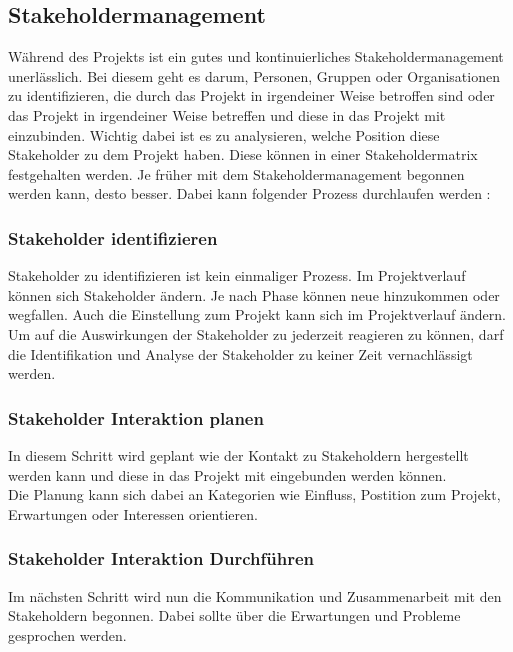 \documentclass[ThesisDJ.tex]{subfiles}
\begin{document}
\subsection{Stakeholdermanagement}

Während des Projekts ist ein gutes und kontinuierliches Stakeholdermanagement unerlässlich. 
Bei diesem geht es darum, Personen, Gruppen oder Organisationen zu identifizieren, die durch das Projekt in irgendeiner Weise betroffen sind oder das
Projekt in irgendeiner Weise betreffen und diese in das Projekt mit einzubinden. Wichtig dabei ist es zu analysieren, welche Position 
diese Stakeholder zu dem Projekt haben. Diese können in einer Stakeholdermatrix festgehalten werden. 
Je früher mit dem Stakeholdermanagement begonnen werden kann, desto besser.
Dabei kann folgender Prozess durchlaufen werden \cite[S.~487]{project_management_institute_guide_2017}:

\subsubsection{Stakeholder identifizieren}
Stakeholder zu identifizieren ist kein einmaliger Prozess. Im Projektverlauf können sich Stakeholder ändern. 
Je nach Phase können neue hinzukommen oder wegfallen. Auch die Einstellung zum Projekt kann sich im Projektverlauf ändern. 
Um auf die Auswirkungen der Stakeholder zu jederzeit reagieren zu können, darf die Identifikation und Analyse der Stakeholder 
zu keiner Zeit vernachlässigt werden.

\subsubsection{Stakeholder Interaktion planen}
In diesem Schritt wird geplant wie der Kontakt zu Stakeholdern hergestellt werden kann und diese in das Projekt mit eingebunden werden können.\\
Die Planung kann sich dabei an Kategorien wie Einfluss, Postition zum Projekt, Erwartungen oder Interessen orientieren.

\subsubsection{Stakeholder Interaktion Durchführen}
Im nächsten Schritt wird nun die Kommunikation und Zusammenarbeit mit den Stakeholdern begonnen. 
Dabei sollte über die Erwartungen und Probleme gesprochen werden.
\end{document}
